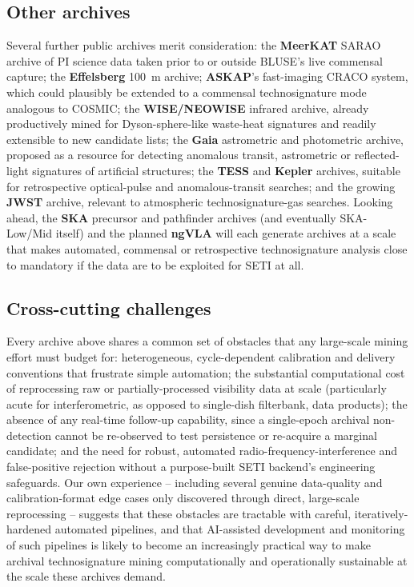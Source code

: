 \documentclass[10pt,twocolumn]{article}
\begin{document}
\subsection{Other archives}
Several further public archives merit consideration: the \textbf{MeerKAT} SARAO archive of PI science data taken prior to or outside BLUSE's live commensal capture; the \textbf{Effelsberg} 100~m archive; \textbf{ASKAP}'s fast-imaging CRACO system, which could plausibly be extended to a commensal technosignature mode analogous to COSMIC; the \textbf{WISE/NEOWISE} infrared archive, already productively mined for Dyson-sphere-like waste-heat signatures \citep{wright2014} and readily extensible to new candidate lists; the \textbf{Gaia} astrometric and photometric archive, proposed as a resource for detecting anomalous transit, astrometric or reflected-light signatures of artificial structures; the \textbf{TESS} and \textbf{Kepler} archives, suitable for retrospective optical-pulse and anomalous-transit searches; and the growing \textbf{JWST} archive, relevant to atmospheric technosignature-gas searches. Looking ahead, the \textbf{SKA} precursor and pathfinder archives (and eventually SKA-Low/Mid itself) and the planned \textbf{ngVLA} will each generate archives at a scale that makes automated, commensal or retrospective technosignature analysis close to mandatory if the data are to be exploited for SETI at all.

\subsection{Cross-cutting challenges}
Every archive above shares a common set of obstacles that any large-scale mining effort must budget for: heterogeneous, cycle-dependent calibration and delivery conventions that frustrate simple automation; the substantial computational cost of reprocessing raw or partially-processed visibility data at scale (particularly acute for interferometric, as opposed to single-dish filterbank, data products); the absence of any real-time follow-up capability, since a single-epoch archival non-detection cannot be re-observed to test persistence or re-acquire a marginal candidate; and the need for robust, automated radio-frequency-interference and false-positive rejection without a purpose-built SETI backend's engineering safeguards. Our own experience -- including several genuine data-quality and calibration-format edge cases only discovered through direct, large-scale reprocessing -- suggests that these obstacles are tractable with careful, iteratively-hardened automated pipelines, and that AI-assisted development and monitoring of such pipelines is likely to become an increasingly practical way to make archival technosignature mining computationally and operationally sustainable at the scale these archives demand.
\end{document}
